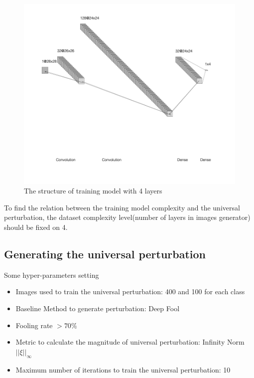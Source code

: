 \documentclass{article}
\begin{document}
\begin{figure}[h]
    \centering
    \includegraphics[width=1\linewidth]{training_model_structure.png}
    \caption{\small The structure of training model with 4 layers}
    \label{fig:training_model_structure}
\end{figure}

To find the relation between the training model complexity and the universal perturbation, the dataset complexity level(number of layers in images generator) should be fixed on 4.

\subsection{Generating the universal perturbation}

Some hyper-parameters setting
\begin{itemize}
    \item Images used to train the universal perturbation: 400 and 100 for each class
    \item Baseline Method to generate perturbation: Deep Fool
    \item Fooling rate $> 70\%$
    \item Metric to calculate the magnitude of universal perturbation: Infinity Norm $||\xi||_\infty$
    \item Maximum number of iterations to train the universal perturbation: 10
\end{itemize}
\end{document}
